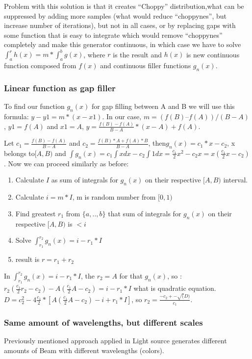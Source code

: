 \documentclass[12pt, letterpaper]{article}
\begin{document}
Problem with this solution is that it creates “Choppy” distribution,what can be suppressed by adding more samples (what would reduce “choppynes”, but increase number of iterations), but not in all  cases, or by replacing gaps with some function that is easy to integrate which would remove “choppynes” completely and make this generator continuous, in which case we have to solve $\int_{a}^{r}h(x) = m*\int_{a}^{b}g(x)$, where $r$ is the result and $h(x)$ is new continuous function composed from $f(x)$ and continuous filler functions $g_n(x)$.

\subsubsection{Linear function as gap filler}
To find our function $g_n(x)$ for gap filling between A and B we will use this formula: $y - y1 = m*(x-x1)$. In our case, $m = (f(B) – f(A))/(B-A)$ , $y1 = f(A)$ and $x1 = A$, $y = \frac{f(B)-f(A)}{B-A} *( x - A ) + f( A ) $.

Let $c_1 = \frac{f(B)-f(A)}{B-A}$ and $c_2 = \frac{f(B)*A+f(A)*B}{B-A}$, then$g_n(x) = c_1*x - c_2$, x belongs to$[A,B)$ and $\int g_n(x) = c_1\int xdx - c_2\int 1dx = \frac{c_1}{2}x^2 - c_2x =x(\frac{c_1}{2}x - c_2)$. Now we can proceed similarly as before:  
\begin{enumerate}
\item Calculate $I$ as sum of integrals for $g_n(x)$ on their respective $[A,B)$ interval.
\item Calculate $i = m*I$, m is random number from $[0,1)$
\item Find greatest $r_1$ from $\{a,..,b\}$ that sum of integrals for $g_n(x)$ on their respective $[A,B)$ is $< i$
\item Solve $\int_{r_1}^{r_2}g_n(x) = i - r_1*I$
\item result is $r = r_1 + r_2$
\end{enumerate}

In  $\int_{r_1}^{r_2}g_n(x) = i - r_1*I$, the $r_2 = A$ for that $g_n(x)$, so : $r_2(\frac{c_1}{2}r_2-c_2) - A(\frac{c_1}{2}A -c_2) = i - r_1*I$ what is quadratic equation. $D = c_{2}^{2} - 4\frac{c_1}{2}*[A(\frac{c_1}{2}A-c_2)-i+r_1*I]$, so $r_2 = \frac{-c_2 +- \sqrt(D)}{c_1}$.
\subsubsection{Same amount of wavelengths, but different scales}
Previously mentioned approach applied in Light source generates different amounts of Beam with different wavelengths (colors).
\end{document}
